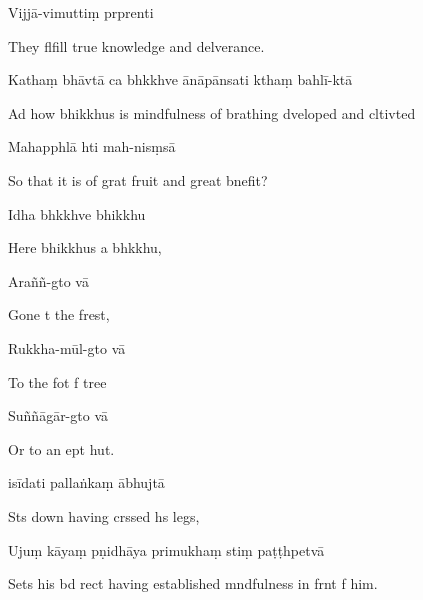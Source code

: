 Vijjā-vimuttiṃ prprenti

\begin{english}
  They flfill true knowledge and delverance.
\end{english}

Kathaṃ bhāvtā ca bhkkhve ānāpānsati kthaṃ bahlī-ktā

\begin{english}
  Ad how bhikkhus is mindfulness of brathing dveloped and cltivted
\end{english}

Mahapphlā hti mah-nisṃsā

\begin{english}
  So that it is of grat fruit and great bnefit?
\end{english}

Idha bhkkhve bhikkhu

\begin{english}
  Here bhikkhus a bhkkhu,
\end{english}

Araññ-gto vā

\begin{english}
  Gone t the frest,
\end{english}

Rukkha-mūl-gto vā

\begin{english}
  To the fot f  tree
\end{english}

Suññāgār-gto vā

\begin{english}
  Or to an ept hut.
\end{english}

isīdati pallaṅkaṃ ābhujtā

\begin{english}
  Sts down having crssed hs legs,
\end{english}

Ujuṃ kāyaṃ pṇidhāya primukhaṃ stiṃ paṭṭhpetvā

\begin{english}
  Sets his bd rect having established mndfulness in frnt f him.
\end{english}

